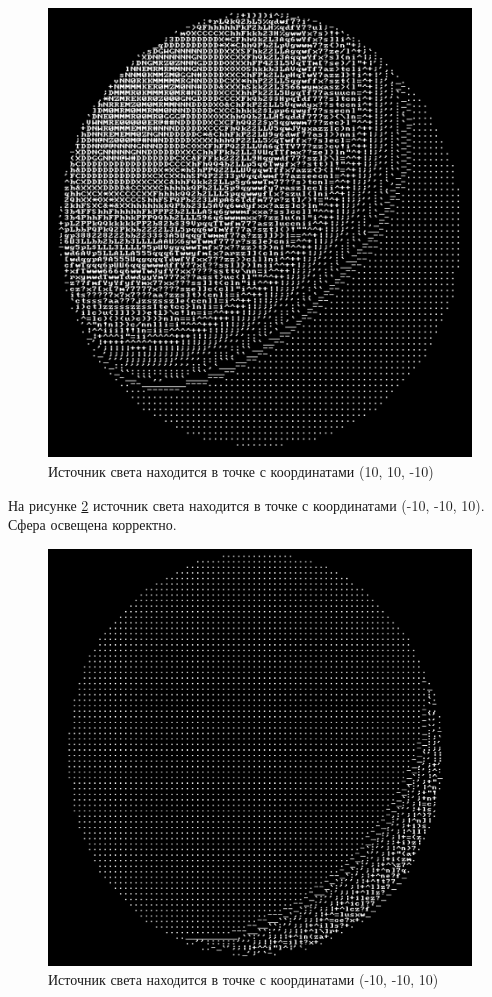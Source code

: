 \begin{figure}[H]
    \centering
    \includegraphics[scale=0.2]{images/test1.png}
    \caption{Источник света находится в точке с координатами (10, 10, -10)}
    \label{fig:test1}
\end{figure}

На рисунке \ref{fig:test2} источник света находится в точке с координатами (-10, -10, 10). Сфера освещена корректно.

\begin{figure}[H]
    \centering
    \includegraphics[scale=0.2]{images/test2.png}
    \caption{Источник света находится в точке с координатами (-10, -10, 10)}
    \label{fig:test2}
\end{figure}

